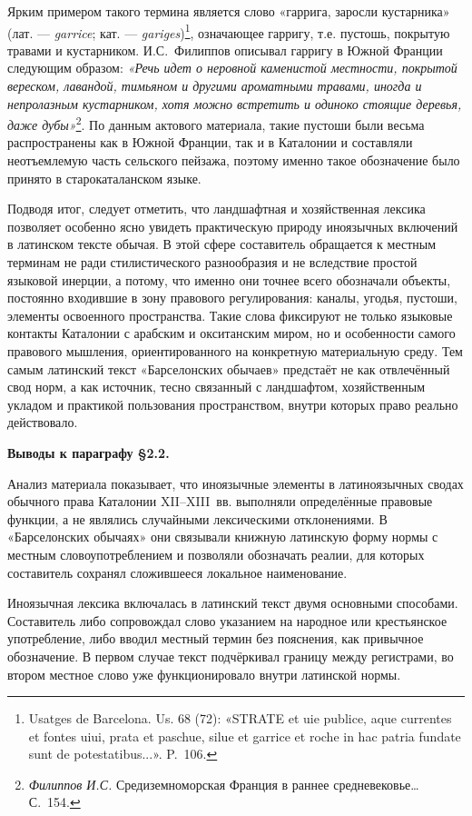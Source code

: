 Ярким примером такого термина является слово «гаррига, заросли кустарника» (лат. --- \emph{garrice}; кат. --- \emph{gariges})\footnote{Usatges de Barcelona. Us. 68 (72): «STRATE et uie publice, aque currentes et fontes uiui, prata et paschue, silue et garrice et roche in hac patria fundate sunt de potestatibus...». P.~106.}, означающее гарригу, т.е. пустошь, покрытую травами и кустарником. И.С.~Филиппов описывал гарригу в Южной Франции следующим образом: \emph{«Речь идет о неровной каменистой местности, покрытой вереском, лавандой, тимьяном и другими ароматными травами, иногда и непролазным кустарником, хотя можно встретить и одиноко стоящие деревья, даже дубы»}\footnote{\emph{ Филиппов И.С. }Средиземноморская Франция в раннее средневековье… С.~154.}. По данным актового материала, такие пустоши были весьма распространены как в Южной Франции, так и в Каталонии и составляли неотъемлемую часть сельского пейзажа, поэтому именно такое обозначение было принято в старокаталанском языке.

Подводя итог, следует отметить, что ландшафтная и хозяйственная лексика позволяет особенно ясно увидеть практическую природу иноязычных включений в латинском тексте обычая. В этой сфере составитель обращается к местным терминам не ради стилистического разнообразия и не вследствие простой языковой инерции, а потому, что именно они точнее всего обозначали объекты, постоянно входившие в зону правового регулирования: каналы, угодья, пустоши, элементы освоенного пространства. Такие слова фиксируют не только языковые контакты Каталонии с арабским и окситанским миром, но и особенности самого правового мышления, ориентированного на конкретную материальную среду. Тем самым латинский текст «Барселонских обычаев» предстаёт не как отвлечённый свод норм, а как источник, тесно связанный с ландшафтом, хозяйственным укладом и практикой пользования пространством, внутри которых право реально действовало.

\textbf{Выводы к параграфу §2.2}\textbf{.}

Анализ материала показывает, что иноязычные элементы в латиноязычных сводах обычного права Каталонии XII--XIII~вв. выполняли определённые правовые функции, а не являлись случайными лексическими отклонениями. В «Барселонских обычаях» они связывали книжную латинскую форму нормы с местным словоупотреблением и позволяли обозначать реалии, для которых составитель сохранял сложившееся локальное наименование.

Иноязычная лексика включалась в латинский текст двумя основными способами. Составитель либо сопровождал слово указанием на народное или крестьянское употребление, либо вводил местный термин без пояснения, как привычное обозначение. В первом случае текст подчёркивал границу между регистрами, во втором местное слово уже функционировало внутри латинской нормы.

